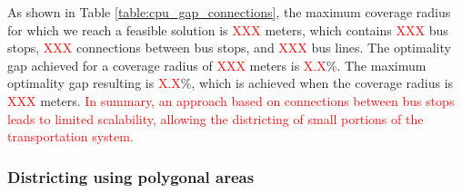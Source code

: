 \documentclass[preprint,11pt]{elsarticle}
\begin{document}
\begin{table}[h]
\centering
\caption{\textcolor{red}{Scalability using connections between bus stops}}
\label{table:cpu_gap_connections}
\end{table}


As shown in Table \ref{table:cpu_gap_connections}, the maximum coverage radius for which we reach a feasible solution is \textcolor{red}{XXX} meters, which contains \textcolor{red}{XXX} bus stops, \textcolor{red}{XXX} connections between bus stops, and \textcolor{red}{XXX} bus lines. 
The optimality gap achieved for a coverage radius of \textcolor{red}{XXX} meters is \textcolor{red}{X.X}\%.
The maximum optimality gap resulting is \textcolor{red}{X.X}\%, which is achieved when the coverage radius is \textcolor{red}{XXX} meters.
\textcolor{red}{In summary, an approach based on connections between bus stops leads to limited scalability, allowing the districting of small portions of the transportation system.}

\subsubsection{Districting using polygonal areas} \label{sec:polygons}
\end{document}

